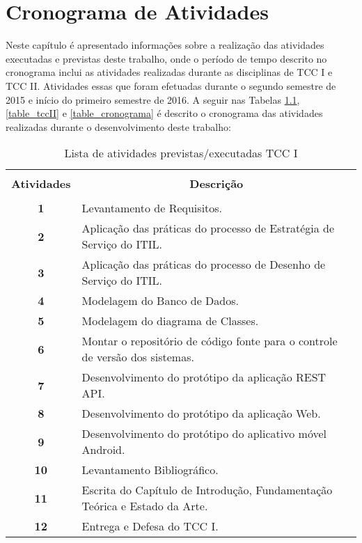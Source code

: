 \chapter{Cronograma de Atividades}

\noindent Neste capítulo é apresentado informações sobre a realização das atividades executadas e previstas deste trabalho, onde o período de tempo descrito no cronograma inclui as atividades realizadas durante as disciplinas de TCC I e TCC II. Atividades essas que foram efetuadas durante o segundo semestre de 2015 e início do primeiro semestre de 2016. A seguir nas Tabelas \ref{table_tccI}, \ref{table_tccII} e \ref{table_cronograma} é descrito o cronograma das atividades realizadas durante o desenvolvimento deste trabalho:\\

\begin{table}[!h]
  \centering
  \begin{tabular}{cp{9.4cm}}
    \hline \hline &\\[-0.4cm]
    {\bf Atividades} & \multicolumn{1}{c}{\bf Descrição} \\
    \hline
    &\\[-0.4cm]
    \textbf{1} & Levantamento de Requisitos. \\[0.2cm]
    \textbf{2} & Aplicação das práticas do processo de Estratégia de Serviço do ITIL.\\[0.2cm]
    \textbf{3} & Aplicação das práticas do processo de Desenho de Serviço do ITIL.\\[0.2cm]    
    \textbf{4} & Modelagem do Banco de Dados. \\[0.2cm]
    \textbf{5} & Modelagem do diagrama de Classes. \\[0.2cm]
    \textbf{6} & Montar o repositório de código fonte para o controle de versão dos sistemas. \\[0.2cm]
    \textbf{7} & Desenvolvimento do protótipo da aplicação REST API.\\[0.2cm]    
    \textbf{8} & Desenvolvimento do protótipo da aplicação Web. \\[0.2cm]
    \textbf{9} & Desenvolvimento do protótipo do aplicativo móvel Android. \\[0.2cm]
    \textbf{10} & Levantamento Bibliográfico. \\[0.2cm]
    \textbf{11} & Escrita do Capítulo de Introdução, Fundamentação Teórica e Estado da Arte. \\[0.2cm]
    \textbf{12} & Entrega e Defesa do TCC I. \\[0.2cm]
    \hline \hline
  \end{tabular}
  \caption{Lista de atividades previstas/executadas TCC I}
  \label{table_tccI}
\end{table}



